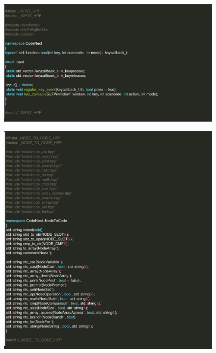 \begin{figure}[H]
	 \centering
	 \includegraphics[width=\textwidth]{figures/code/input.png}
\end{figure}
\begin{figure}[H]
	 \centering
	 \includegraphics[width=\textwidth]{figures/code/node_to_code.png}
\end{figure}
